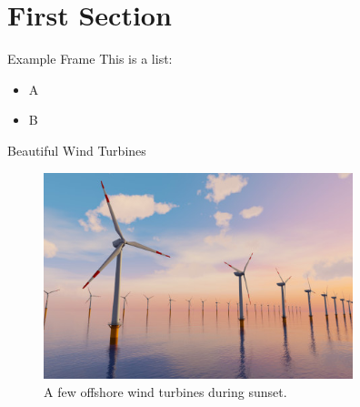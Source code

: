 \section[First Section]{First Section}
\begin{frame}{Example Frame}  		
This is a list:
\begin{itemize}
	\item A
	\item B
\end{itemize}
\end{frame}
\begin{frame}{Beautiful Wind Turbines}  		
	\begin{figure}
		\centering	
		\includegraphics[height=6cm]{figures/WindTurbines.jpg}
		\caption{A few offshore wind turbines during sunset.}
	\end{figure}
\end{frame}
